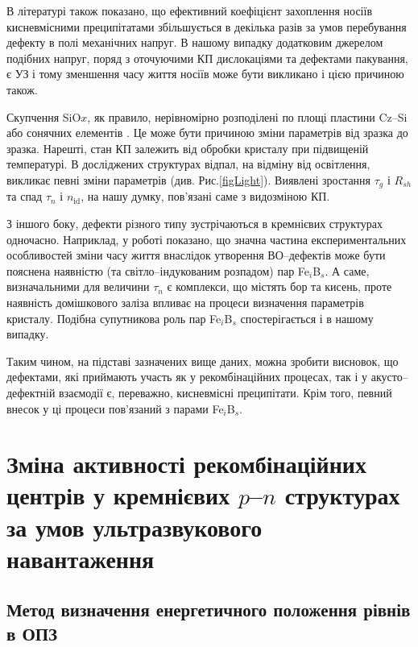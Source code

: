 В літературі \cite{MurphyJAP2011} також показано, що ефективний коефіцієнт захоплення носіїв кисневмісними
преципітатами збільшується в декілька разів за умов перебування дефекту в полі механічних напруг.
В нашому випадку додатковим джерелом подібних напруг, поряд
з оточуючими КП дислокаціями та дефектами пакування, є УЗ і тому зменшення
часу життя носіїв може бути викликано і цією причиною також.

Скупчення SiO$x$, як правило, нерівномірно розподілені по площі пластини  Cz--Si \cite{Oxide_Schon} або сонячних елементів \cite{Oxide:Chen}.
Це може бути причиною зміни параметрів від зразка до зразка.
Нарешті,  стан КП залежить від обробки кристалу при підвищеній температурі.
В досліджених структурах відпал, на відміну від освітлення, викликає певні зміни параметрів (див. Рис.\ref{figLight}).
Виявлені зростання $\tau_g$ і $R_{sh}$ та спад $\tau_n$ і $n_\mathrm{id}$, на нашу думку, пов'язані саме з видозміною КП.

З іншого боку, дефекти різного типу зустрічаються в кремнієвих структурах одночасно.
Наприклад, у роботі \cite{BO:Fe} показано, що значна частина експериментальних особливостей зміни часу життя
внаслідок утворення ВО--дефектів може бути пояснена наявністю (та світло--індукованим розпадом) пар  Fe$_i$B$_s$.
А саме, визначальними для величини $\tau_n$ є комплекси, що містять бор та кисень, проте
наявність домішкового заліза впливає на процеси визначення параметрів кристалу.
Подібна супутникова роль пар Fe$_i$B$_s$ спостерігається і в нашому випадку.

Таким чином, на підставі зазначених вище даних, можна зробити висновок,
що дефектами, які приймають участь як у рекомбінаційних процесах, так і у акусто--дефектній взаємодії є, переважно,
кисневмісні преципітати.
Крім того, певний внесок у ці процеси пов'язаний з парами Fe$_i$B$_s$.

\section{Зміна активності рекомбінаційних центрів у кремнієвих $p$--$n$ структурах за умов ультразвукового навантаження\label{sBulyrMethod}}

\subsection{Метод визначення енергетичного положення рівнів в ОПЗ}

